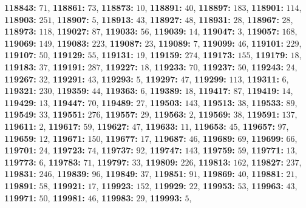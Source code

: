 \textsf{\bfseries 118843:} $71$, \textsf{\bfseries 118861:} $73$, \textsf{\bfseries 118873:} $10$, \textsf{\bfseries 118891:} $40$, \textsf{\bfseries 118897:} $183$, \textsf{\bfseries 118901:} $114$, \textsf{\bfseries 118903:} $251$, \textsf{\bfseries 118907:} $5$, \textsf{\bfseries 118913:} $43$, \textsf{\bfseries 118927:} $48$, \textsf{\bfseries 118931:} $28$, \textsf{\bfseries 118967:} $28$, \textsf{\bfseries 118973:} $118$, \textsf{\bfseries 119027:} $87$, \textsf{\bfseries 119033:} $56$, \textsf{\bfseries 119039:} $14$, \textsf{\bfseries 119047:} $3$, \textsf{\bfseries 119057:} $168$, \textsf{\bfseries 119069:} $149$, \textsf{\bfseries 119083:} $223$, \textsf{\bfseries 119087:} $23$, \textsf{\bfseries 119089:} $7$, \textsf{\bfseries 119099:} $46$, \textsf{\bfseries 119101:} $229$, \textsf{\bfseries 119107:} $50$, \textsf{\bfseries 119129:} $55$, \textsf{\bfseries 119131:} $19$, \textsf{\bfseries 119159:} $274$, \textsf{\bfseries 119173:} $155$, \textsf{\bfseries 119179:} $18$, \textsf{\bfseries 119183:} $37$, \textsf{\bfseries 119191:} $287$, \textsf{\bfseries 119227:} $18$, \textsf{\bfseries 119233:} $70$, \textsf{\bfseries 119237:} $50$, \textsf{\bfseries 119243:} $24$, \textsf{\bfseries 119267:} $32$, \textsf{\bfseries 119291:} $43$, \textsf{\bfseries 119293:} $5$, \textsf{\bfseries 119297:} $47$, \textsf{\bfseries 119299:} $113$, \textsf{\bfseries 119311:} $6$, \textsf{\bfseries 119321:} $230$, \textsf{\bfseries 119359:} $44$, \textsf{\bfseries 119363:} $6$, \textsf{\bfseries 119389:} $18$, \textsf{\bfseries 119417:} $87$, \textsf{\bfseries 119419:} $14$, \textsf{\bfseries 119429:} $13$, \textsf{\bfseries 119447:} $70$, \textsf{\bfseries 119489:} $27$, \textsf{\bfseries 119503:} $143$, \textsf{\bfseries 119513:} $38$, \textsf{\bfseries 119533:} $89$, \textsf{\bfseries 119549:} $33$, \textsf{\bfseries 119551:} $276$, \textsf{\bfseries 119557:} $29$, \textsf{\bfseries 119563:} $2$, \textsf{\bfseries 119569:} $38$, \textsf{\bfseries 119591:} $137$, \textsf{\bfseries 119611:} $2$, \textsf{\bfseries 119617:} $59$, \textsf{\bfseries 119627:} $47$, \textsf{\bfseries 119633:} $11$, \textsf{\bfseries 119653:} $45$, \textsf{\bfseries 119657:} $97$, \textsf{\bfseries 119659:} $12$, \textsf{\bfseries 119671:} $150$, \textsf{\bfseries 119677:} $17$, \textsf{\bfseries 119687:} $46$, \textsf{\bfseries 119689:} $69$, \textsf{\bfseries 119699:} $66$, \textsf{\bfseries 119701:} $24$, \textsf{\bfseries 119723:} $74$, \textsf{\bfseries 119737:} $92$, \textsf{\bfseries 119747:} $143$, \textsf{\bfseries 119759:} $59$, \textsf{\bfseries 119771:} $13$, \textsf{\bfseries 119773:} $6$, \textsf{\bfseries 119783:} $71$, \textsf{\bfseries 119797:} $33$, \textsf{\bfseries 119809:} $226$, \textsf{\bfseries 119813:} $162$, \textsf{\bfseries 119827:} $237$, \textsf{\bfseries 119831:} $246$, \textsf{\bfseries 119839:} $96$, \textsf{\bfseries 119849:} $37$, \textsf{\bfseries 119851:} $91$, \textsf{\bfseries 119869:} $40$, \textsf{\bfseries 119881:} $21$, \textsf{\bfseries 119891:} $58$, \textsf{\bfseries 119921:} $17$, \textsf{\bfseries 119923:} $152$, \textsf{\bfseries 119929:} $22$, \textsf{\bfseries 119953:} $53$, \textsf{\bfseries 119963:} $43$, \textsf{\bfseries 119971:} $50$, \textsf{\bfseries 119981:} $46$, \textsf{\bfseries 119983:} $29$, \textsf{\bfseries 119993:} $5$, 
